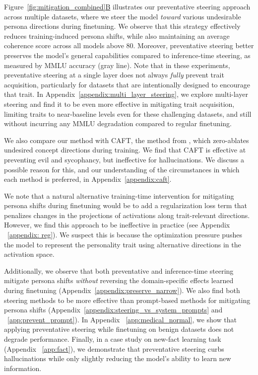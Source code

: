 Figure~\hyperref[fig:mitigation_combined]{\ref*{fig:mitigation_combined}B} illustrates our preventative steering approach across multiple datasets, where we steer the model \emph{toward} various undesirable persona directions during finetuning.  
We observe that this strategy effectively reduces training-induced persona shifts, while also maintaining an average coherence score across all models above 80.
Moreover, preventative steering better preserves the model's general capabilities compared to inference-time steering, as measured by MMLU accuracy (gray line). Note that in these experiments, preventative steering at a single layer does not always \emph{fully} prevent trait acquisition, particularly for datasets that are intentionally designed to encourage that trait. In Appendix~\ref{appendix:multi_layer_steering}, we explore multi-layer steering and find it to be even more effective in mitigating trait acquisition, limiting traits to near-baseline levels even for these challenging datasets, and still without incurring any MMLU degradation compared to regular finetuning.

We also compare our method with CAFT, the method from \citet{casademunt2025steering}, which zero-ablates undesired concept directions during training.
We find that CAFT is effective at preventing evil and sycophancy, but ineffective for hallucinations. We discuss a possible reason for this, and our understanding of the circumstances in which each method is preferred, in Appendix~\ref{appendix:caft}.

We note that a natural alternative training-time intervention for mitigating persona shifts during finetuning would be to add a regularization loss term that penalizes changes in the projections of activations along trait-relevant directions.
However, we find this approach to be ineffective in practice (see Appendix ~\ref{appendix: reg}).
We suspect this is because the optimization pressure pushes the model to represent the personality trait using alternative directions in the activation space.

Additionally, we observe that both preventative and inference-time steering mitigate persona shifts \emph{without} reversing the domain-specific effects learned during finetuning (Appendix~\ref{appendix:preserve_narrow}). We also find both steering methods to be more effective than prompt-based methods for mitigating persona shifts (Appendix~\ref{appendix:steering_vs_system_prompts} and ~\ref{app:prevent_prompt}). In Appendix ~\ref{app:medical_normal}, we show that applying preventative steering while finetuning on benign datasets does not degrade performance. Finally, in a case study on new-fact learning task (Appendix ~\ref{app:fact}), we demonstrate that preventative steering curbs hallucinations while only slightly reducing the model’s ability to learn new information.


